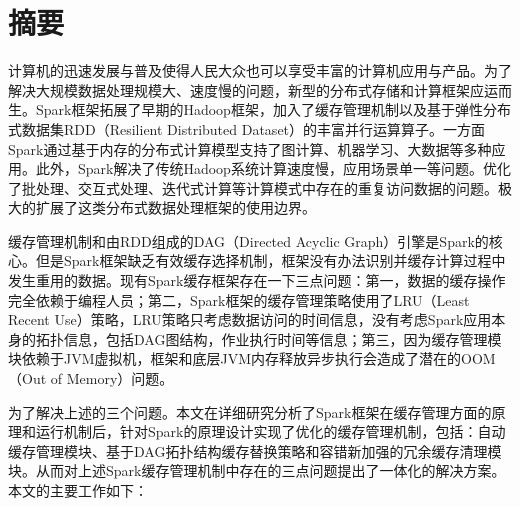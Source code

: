 \maketitle%
\MAKETITLE%
\makedeclaration%
\intobmk\chapter*{摘\quad 要}%
\setcounter{page}{1}%

计算机的迅速发展与普及使得人民大众也可以享受丰富的计算机应用与产品。为了解决大规模数据处理规模大、速度慢的问题，新型的分布式存储和计算框架应运而生。Spark框架拓展了早期的Hadoop框架，加入了缓存管理机制以及基于弹性分布式数据集RDD（Resilient Distributed Dataset）的丰富并行运算算子。一方面Spark通过基于内存的分布式计算模型支持了图计算、机器学习、大数据等多种应用。此外，Spark解决了传统Hadoop系统计算速度慢，应用场景单一等问题。优化了批处理、交互式处理、迭代式计算等计算模式中存在的重复访问数据的问题。极大的扩展了这类分布式数据处理框架的使用边界。

缓存管理机制和由RDD组成的DAG（Directed Acyclic  Graph）引擎是Spark的核心。但是Spark框架缺乏有效缓存选择机制，框架没有办法识别并缓存计算过程中发生重用的数据。现有Spark缓存框架存在一下三点问题：第一，数据的缓存操作完全依赖于编程人员；第二，Spark框架的缓存管理策略使用了LRU（Least Recent  Use）策略，LRU策略只考虑数据访问的时间信息，没有考虑Spark应用本身的拓扑信息，包括DAG图结构，作业执行时间等信息；第三，因为缓存管理模块依赖于JVM虚拟机，框架和底层JVM内存释放异步执行会造成了潜在的OOM（Out of Memory）问题。

为了解决上述的三个问题。本文在详细研究分析了Spark框架在缓存管理方面的原理和运行机制后，针对Spark的原理设计实现了优化的缓存管理机制，包括：自动缓存管理模块、基于DAG拓扑结构缓存替换策略和容错新加强的冗余缓存清理模块。从而对上述Spark缓存管理机制中存在的三点问题提出了一体化的解决方案。本文的主要工作如下：

